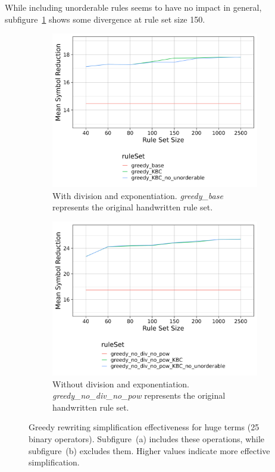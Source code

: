 While including unorderable rules seems to have no impact in general, subfigure~\ref{fig:greedy_with_div} shows some divergence at rule set size 150. 

\begin{figure}[h]
	\centering
	\begin{subfigure}[t]{0.48\textwidth}
		\centering
		\includegraphics[width=\linewidth]{img/for_plot_random_terms_huge.png}
		\caption{With division and exponentiation. \emph{greedy\_base} represents the original handwritten rule set.}
		\label{fig:greedy_with_div}
	\end{subfigure}
	\hfill
	\begin{subfigure}[t]{0.48\textwidth}
		\centering
		\includegraphics[width=\linewidth]{img/for_plot_no_div_no_pow_random_terms_huge.png}
		\caption{Without division and exponentiation. \emph{greedy\_no\_div\_no\_pow} represents the original handwritten rule set.}
		\label{fig:greedy_no_div}
	\end{subfigure}
	\caption{
		Greedy rewriting simplification effectiveness for huge terms (25 binary operators).
		Subfigure~(a) includes these operations, while subfigure~(b) excludes them. 
		Higher values indicate more effective simplification.
	}
	\label{fig:greedy_comparison}
\end{figure}


